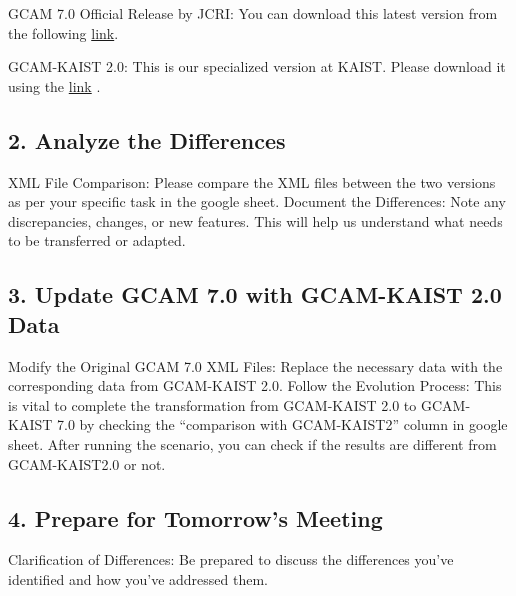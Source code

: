 \documentclass[
  letterpaper,
  DIV=11,
  numbers=noendperiod]{scrartcl}
\begin{document}
GCAM 7.0 Official Release by JCRI: You can download this latest version
from the following
\href{https://github.com/JGCRI/gcam-core/releases/download/gcam-v7.0/gcam-v7.0-Windows-Release-Package.zip}{link}.

GCAM-KAIST 2.0: This is our specialized version at KAIST. Please
download it using the
\href{https://o365kaist-my.sharepoint.com/:f:/g/personal/ahmeds_office_kaist_ac_kr/EuCnuJZbojFLjz5o0q3dwaYBQ4QihxB_7z8umGiHIeos8A?e=jnZFqE}{link}
.

\hypertarget{analyze-the-differences}{%
\subsection{2. Analyze the Differences}\label{analyze-the-differences}}

XML File Comparison: Please compare the XML files between the two
versions as per your specific task in the google sheet. Document the
Differences: Note any discrepancies, changes, or new features. This will
help us understand what needs to be transferred or adapted.

\hypertarget{update-gcam-7.0-with-gcam-kaist-2.0-data}{%
\subsection{3. Update GCAM 7.0 with GCAM-KAIST 2.0
Data}\label{update-gcam-7.0-with-gcam-kaist-2.0-data}}

Modify the Original GCAM 7.0 XML Files: Replace the necessary data with
the corresponding data from GCAM-KAIST 2.0. Follow the Evolution
Process: This is vital to complete the transformation from GCAM-KAIST
2.0 to GCAM-KAIST 7.0 by checking the ``comparison with GCAM-KAIST2''
column in google sheet. After running the scenario, you can check if the
results are different from GCAM-KAIST2.0 or not.

\hypertarget{prepare-for-tomorrows-meeting}{%
\subsection{4. Prepare for Tomorrow's
Meeting}\label{prepare-for-tomorrows-meeting}}

Clarification of Differences: Be prepared to discuss the differences
you've identified and how you've addressed them.
\end{document}
